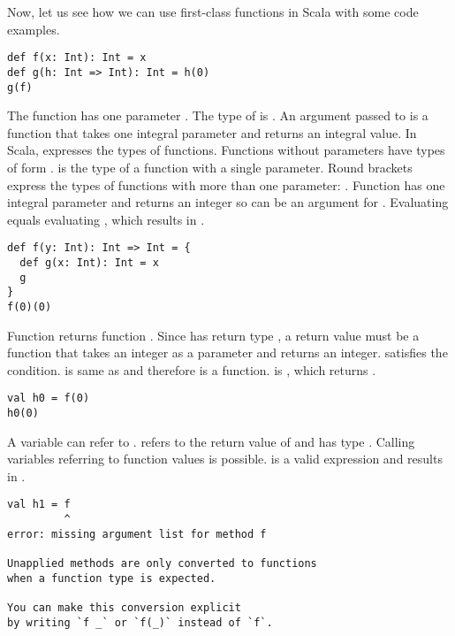 Now, let us see how we can use first-class functions in Scala with some code
examples.

\begin{verbatim}
def f(x: Int): Int = x
def g(h: Int => Int): Int = h(0)
g(f)
\end{verbatim}

The function  has one parameter . The type of  is .
An argument passed to  is a function that takes one integral
parameter and returns an integral value. In Scala, \code{=>} expresses the types
of functions. Functions without parameters have types of form .
 is the type of a function with a
single parameter. Round brackets express the types of functions with more than
one parameter: . Function 
has one integral parameter and returns an integer so can be an argument for
. Evaluating  equals evaluating , which results
in .

\begin{verbatim}
def f(y: Int): Int => Int = {
  def g(x: Int): Int = x
  g
}
f(0)(0)
\end{verbatim}

Function  returns function . Since  has return type
, a return value must be a function that takes an integer as a
parameter and returns an integer.  satisfies the condition. 
is same as  and therefore is a function.  is ,
which returns .

\begin{verbatim}
val h0 = f(0)
h0(0)
\end{verbatim}

A variable can refer to .  refers to the return value of
 and has type . Calling variables referring to
function values is possible.  is a valid expression and results in
.

\begin{verbatim}
val h1 = f
         ^
error: missing argument list for method f

Unapplied methods are only converted to functions
when a function type is expected.

You can make this conversion explicit
by writing `f _` or `f(_)` instead of `f`.
\end{verbatim}


